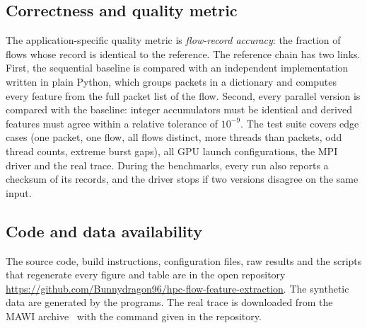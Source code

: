 \subsection{Correctness and quality metric}
The application-specific quality metric is \emph{flow-record accuracy}: the
fraction of flows whose record is identical to the reference. The reference
chain has two links. First, the sequential baseline is compared with an
independent implementation written in plain Python, which groups packets in
a dictionary and computes every feature from the full packet list of the
flow. Second, every parallel version is compared with the baseline: integer
accumulators must be identical and derived features must agree within a
relative tolerance of $10^{-9}$. The test suite covers edge cases (one
packet, one flow, all flows distinct, more threads than packets, odd thread
counts, extreme burst gaps), all GPU launch configurations, the MPI driver and
the real trace. During the benchmarks, every run also reports a checksum of
its records, and the driver stops if two versions disagree on the same input.

\subsection{Code and data availability}
The source code, build instructions, configuration files, raw results and the
scripts that regenerate every figure and table are in the open repository
\url{https://github.com/Bunnydragon96/hpc-flow-feature-extraction}. The
synthetic data are generated by the programs. The real trace is downloaded
from the MAWI archive~\cite{mawi} with the command given in the repository.
